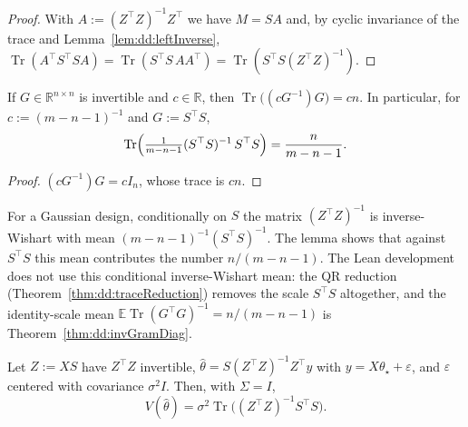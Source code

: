 \begin{proof}
  \leanok
With $A:=(Z^\top Z)^{-1}Z^\top$ we have $M=SA$ and, by cyclic invariance of the trace and Lemma~\ref{lem:dd:leftInverse},
$\operatorname{Tr}(A^\top S^\top SA)=\operatorname{Tr}(S^\top S\,AA^\top)=\operatorname{Tr}(S^\top S(Z^\top Z)^{-1})$.
\end{proof}

\begin{lemma}\label{lem:dd:wishartCancel}
  \leanok
If $G\in\mathbb R^{n\times n}$ is invertible and $c\in\mathbb R$, then $\operatorname{Tr}\bigl((cG^{-1})G\bigr)=cn$. In particular, for
$c:=(m-n-1)^{-1}$ and $G:=S^\top S$,
\[
  \operatorname{Tr}\Bigl(\tfrac1{m-n-1}(S^\top S)^{-1}\,S^\top S\Bigr)=\frac n{m-n-1}.
\]
\end{lemma}

\begin{proof}
  \leanok
$(cG^{-1})G=cI_n$, whose trace is $cn$.
\end{proof}

\begin{remark}\label{rmk:dd:wishartRole}
For a Gaussian design, conditionally on $S$ the matrix $(Z^\top Z)^{-1}$ is inverse-Wishart with mean
$(m-n-1)^{-1}(S^\top S)^{-1}$. The lemma shows that against $S^\top S$ this mean contributes the number
$n/(m-n-1)$. The Lean development does not use this conditional inverse-Wishart mean: the QR reduction (Theorem~\ref{thm:dd:traceReduction}) removes the scale $S^\top S$ altogether, and the identity-scale mean
$\mathbb E\operatorname{Tr}(G^\top G)^{-1}=n/(m-n-1)$ is Theorem~\ref{thm:dd:invGramDiag}.
\end{remark}

\begin{theorem}\label{thm:dd:featureVariance}
  \leanok
Let $Z:=XS$ have $Z^\top Z$ invertible, $\hat\theta=S(Z^\top Z)^{-1}Z^\top y$ with $y=X\theta_\star+\varepsilon$, and
$\varepsilon$ centered with covariance $\sigma^2I$. Then, with $\Sigma=I$,
\[
  V(\hat\theta)=\sigma^2\operatorname{Tr}\bigl((Z^\top Z)^{-1}S^\top S\bigr).
\]
\end{theorem}

